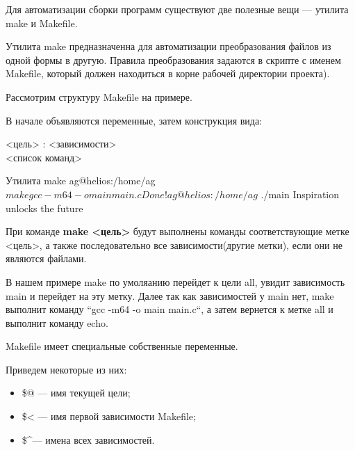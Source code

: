 Для автоматизации сборки программ существуют две полезные вещи --- утилита make и Makefile.

Утилита make предназначенна для автоматизации преобразования файлов из одной формы в другую. Правила преобразования задаются в скрипте с именем Makefile, который должен находиться в корне рабочей директории проекта).

Рассмотрим структуру Makefile на примере.


В начале объявляются переменные, затем конструкция вида:

<цель> : <зависимости> \\
<список команд>
			
\begin{shCode}{Утилита make}
	ag@helios:/home/ag $ make
	gcc -m64 -o main main.c
	Done!
	ag@helios:/home/ag $ ./main
	Inspiration unlocks the future \end{shCode}

При команде \textbf{make <цель>} будут выполнены команды соответствующие метке <цель>, а также последовательно все зависимости(другие метки), если они не являются файлами.

В нашем примере make по умоляанию перейдет к цели all, увидит зависимость main и перейдет на эту метку. Далее так как зависимостей у main нет, make выполнит команду “gcc -m64 -o main main.c“, а затем вернется к метке all и выполнит команду echo.

Makefile имеет специальные собственные переменные.

Приведем некоторые из них:

\begin{itemize}
	\item \$@  --- имя текущей цели;

	\item \$<  --- имя первой зависимости Makefile;

	\item \$\textasciicircum  --- имена всех зависимостей.
\end{itemize}
